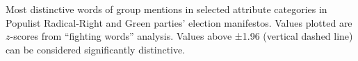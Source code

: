 Most distinctive words of group mentions in selected attribute categories in Populist Radical-Right and Green parties' election manifestos. Values plotted are $z$-scores from ``fighting words'' analysis. Values above ±1.96 (vertical dashed line) can be considered significantly distinctive.